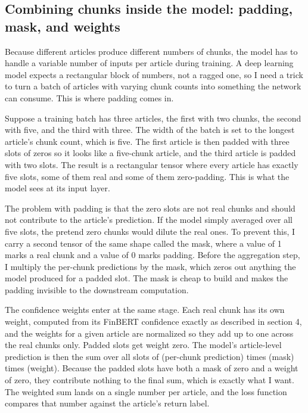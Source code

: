 \documentclass[11pt]{article}
\begin{document}
\subsection{Combining chunks inside the model: padding, mask, and weights}

Because different articles produce different numbers of chunks, the model has to handle a variable number of inputs per article during training. A deep learning model expects a rectangular block of numbers, not a ragged one, so I need a trick to turn a batch of articles with varying chunk counts into something the network can consume. This is where padding comes in.

Suppose a training batch has three articles, the first with two chunks, the second with five, and the third with three. The width of the batch is set to the longest article's chunk count, which is five. The first article is then padded with three slots of zeros so it looks like a five-chunk article, and the third article is padded with two slots. The result is a rectangular tensor where every article has exactly five slots, some of them real and some of them zero-padding. This is what the model sees at its input layer.

The problem with padding is that the zero slots are not real chunks and should not contribute to the article's prediction. If the model simply averaged over all five slots, the pretend zero chunks would dilute the real ones. To prevent this, I carry a second tensor of the same shape called the mask, where a value of 1 marks a real chunk and a value of 0 marks padding. Before the aggregation step, I multiply the per-chunk predictions by the mask, which zeros out anything the model produced for a padded slot. The mask is cheap to build and makes the padding invisible to the downstream computation.

The confidence weights enter at the same stage. Each real chunk has its own weight, computed from its FinBERT confidence exactly as described in section 4, and the weights for a given article are normalized so they add up to one across the real chunks only. Padded slots get weight zero. The model's article-level prediction is then the sum over all slots of (per-chunk prediction) times (mask) times (weight). Because the padded slots have both a mask of zero and a weight of zero, they contribute nothing to the final sum, which is exactly what I want. The weighted sum lands on a single number per article, and the loss function compares that number against the article's return label.
\end{document}

